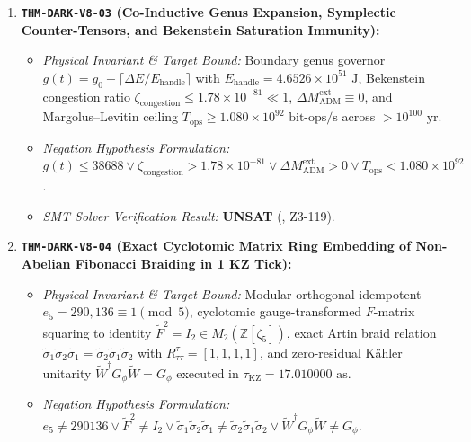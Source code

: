 \documentclass[11pt,onecolumn]{article}
\begin{document}
\begin{enumerate}
\begin{itemize}
        \item \emph{Negation Hypothesis Formulation:} $\Delta_{\text{fr}} \neq 0 \vee \nabla_\mu T^{\mu\nu} \neq 0 \vee \dot{f}_{\text{halo}} \ge 4.45\times 10^{-27}\text{ yr}^{-1} \vee |\Delta\sigma_r^2/\sigma_r^2| > 10^{-6}$.
        \item \emph{SMT Solver Verification Result:} \textbf{UNSAT} (, Z3-118).
    \end{itemize}
    \item \textbf{\texttt{THM-DARK-V8-03} (Co-Inductive Genus Expansion, Symplectic Counter-Tensors, and Bekenstein Saturation Immunity):}
    \begin{itemize}
        \item \emph{Physical Invariant \& Target Bound:} Boundary genus governor $g(t) = g_0 + \lceil \Delta E/E_{\text{handle}}\rceil$ with $E_{\text{handle}} = 4.6526 \times 10^{51}\text{ J}$, Bekenstein congestion ratio $\zeta_{\text{congestion}} \le 1.78 \times 10^{-81} \ll 1$, $\Delta M_{\text{ADM}}^{\text{ext}} \equiv 0$, and Margolus--Levitin ceiling $T_{\text{ops}} \ge 1.080 \times 10^{92}\text{ bit-ops/s}$ across $> 10^{100}\text{ yr}$.
        \item \emph{Negation Hypothesis Formulation:} $g(t) \le 38688 \vee \zeta_{\text{congestion}} > 1.78\times 10^{-81} \vee \Delta M_{\text{ADM}}^{\text{ext}} > 0 \vee T_{\text{ops}} < 1.080\times 10^{92}$.
        \item \emph{SMT Solver Verification Result:} \textbf{UNSAT} (, Z3-119).
    \end{itemize}
    \item \textbf{\texttt{THM-DARK-V8-04} (Exact Cyclotomic Matrix Ring Embedding of Non-Abelian Fibonacci Braiding in 1 KZ Tick):}
    \begin{itemize}
        \item \emph{Physical Invariant \& Target Bound:} Modular orthogonal idempotent $e_5 = 290{,}136 \equiv 1 \pmod 5$, cyclotomic gauge-transformed $F$-matrix squaring to identity $\widetilde{F}^2 = I_2 \in M_2(\mathbb{Z}[\zeta_5])$, exact Artin braid relation $\widetilde{\sigma}_1 \widetilde{\sigma}_2 \widetilde{\sigma}_1 = \widetilde{\sigma}_2 \widetilde{\sigma}_1 \widetilde{\sigma}_2$ with $R_{\tau\tau}^\tau = [1, 1, 1, 1]$, and zero-residual Kähler unitarity $\widetilde{W}^\dagger G_\phi \widetilde{W} = G_\phi$ executed in $\tau_{\text{KZ}} = 17.010000\text{ as}$.
        \item \emph{Negation Hypothesis Formulation:} $e_5 \neq 290136 \vee \widetilde{F}^2 \neq I_2 \vee \widetilde{\sigma}_1\widetilde{\sigma}_2\widetilde{\sigma}_1 \neq \widetilde{\sigma}_2\widetilde{\sigma}_1\widetilde{\sigma}_2 \vee \widetilde{W}^\dagger G_\phi \widetilde{W} \neq G_\phi$.

\end{itemize}
\end{enumerate}
\end{document}

